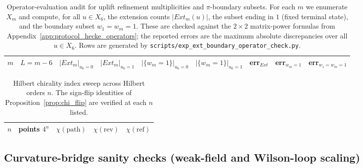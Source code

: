 \begin{table}[H]
\centering
\scriptsize
\setlength{\tabcolsep}{6pt}
\renewcommand{\arraystretch}{1.15}
\begin{tabular}{rrrrrrrrr}
\toprule
$m$ & $L=m-6$ & $|Ext_m|_{u_6=0}$ & $|Ext_m|_{u_6=1}$ & $|\{w_m=1\}|_{u_6=0}$ & $|\{w_m=1\}|_{u_6=1}$ & err$_{Ext}$ & err$_{w_m=1}$ & err$_{w_1=w_m=1}$ \\
\midrule
%
\end{tabular}
\caption{Operator-evaluation audit for uplift refinement multiplicities and $\pi$-boundary subsets.
For each $m$ we enumerate $X_m$ and compute, for all $u\in X_6$, the extension counts $|Ext_m(u)|$, the subset ending in $1$ (fixed terminal state), and the boundary subset $w_1=w_m=1$.
These are checked against the $2\times 2$ matrix-power formulas from Appendix~\ref{app:protocol_hecke_operators}; the reported errors are the maximum absolute discrepancies over all $u\in X_6$.
Rows are generated by \texttt{scripts/exp\_ext\_boundary\_operator\_check.py}.}
\label{tab:ext_boundary_operator_check}
\end{table}

\begin{table}[H]
\centering
\small
\setlength{\tabcolsep}{10pt}
\renewcommand{\arraystretch}{1.15}
\begin{tabular}{rrrrr}
\toprule
$n$ & points $4^n$ & $\chi(\mathrm{path})$ & $\chi(\mathrm{rev})$ & $\chi(\mathrm{ref})$ \\
\midrule
%
\end{tabular}
\caption{Hilbert chirality index sweep across Hilbert orders $n$. The sign-flip identities of Proposition~\ref{prop:chi_flip} are verified at each $n$ listed.}
\label{tab:hilbert_chi_sweep}
\end{table}

\subsection{Curvature-bridge sanity checks (weak-field and Wilson-loop scaling)}



